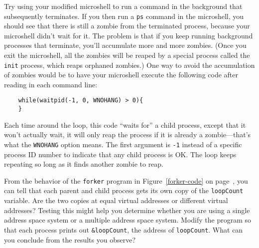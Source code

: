 \begin{chapterEnumerate}
Try using your modified microshell to run a command in the
background that subsequently terminates. If you then run a
\verb|ps| command in the microshell, you should see that there is
still a zombie from the terminated process, because your microshell
didn't wait for it.  The problem is that if you keep running
background processes that terminate, you'll accumulate more and more
zombies.  (Once you exit the microshell, all the zombies will be
reaped by a special process called the \verb|init| process, which
reaps orphaned zombies.)  One way to avoid the accumulation of zombies
would be to have your microshell execute the following code
after reading in each command line:
\begin{verbatim}
    while(waitpid(-1, 0, WNOHANG) > 0){
    }
\end{verbatim}
Each time
around the loop, this code ``waits for'' a child process, except that
it won't actually wait, it will only reap the process if it is already
a zombie---that's what the \verb|WNOHANG| option means.  The first
argument is \verb|-1| instead of a specific process ID number to
indicate that any child process is OK.  The loop keeps repeating so
long as it finds another zombie to reap.
\item
From the behavior of the {\tt forker} program in Figure~\ref{forker-code} on
page~\pageref{forker-code}, you can tell that each parent and child
process gets its own copy of the \verb|loopCount| variable.
Are the two copies at equal virtual addresses or different virtual
addresses?  Testing this might help you determine whether you are
using a single address space system or a multiple address space
system.  Modify the program so that each process prints out
\verb|&loopCount|, the address of \verb|loopCount|.  What can you
conclude from the results you observe?
\end{chapterEnumerate}

